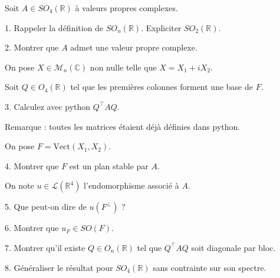 \subetoiles
\columnbreak



\noindent Soit $A \in SO_4(\mathbb{R})$ à valeurs propres complexes.

\vspace{5pt}
1. Rappeler la définition de $SO_n(\mathbb{R})$. Expliciter $SO_2(\mathbb{R})$.

\vspace{5pt}
2. Montrer que $A$ admet une valeur propre complexe.

\vspace{5pt}
\noindent On pose $X \in \mathcal{M}_n(\mathbb{C})$ non nulle telle que $X = X_1 + iX_2$.

\noindent Soit $Q \in O_4(\mathbb{R})$ tel que les premières colonnes forment une base de $F$.

\vspace{5pt}
3. Calculez avec python $Q^\top AQ$.

Remarque : toutes les matrices étaient déjà définies dans python.

\vspace{5pt}
\noindent On pose $F = \mathrm{Vect}(X_1, X_2)$.

\vspace{5pt}
4. Montrer que $F$ est un plan stable par $A$.

\vspace{5pt}
On note $u \in \mathcal{L}(\mathbb{R}^4)$ l'endomorphisme associé à $A$.

\vspace{5pt}
5. Que peut-on dire de $u(F^\bot)$ ?

\vspace{5pt}
6. Montrer que $u_F \in SO(F)$.

\vspace{5pt}
7. Montrer qu'il existe $Q \in O_n(\mathbb{R})$ tel que $Q^\top AQ$ soit diagonale par bloc.

\vspace{5pt}
8. Généraliser le résultat pour $SO_4(\mathbb{R})$ sans contrainte sur son spectre.

\subetoiles